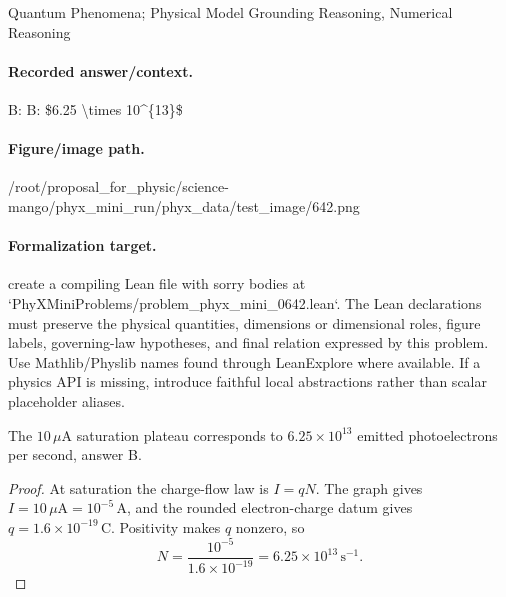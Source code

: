 Quantum Phenomena; Physical Model Grounding Reasoning, Numerical Reasoning

\paragraph{Recorded answer/context.}
B: B: \$6.25 \textbackslash{}times 10\textasciicircum{}\{13\}\$

\paragraph{Figure/image path.}
/root/proposal\_for\_physic/science-mango/phyx\_mini\_run/phyx\_data/test\_image/642.png

\paragraph{Formalization target.}
create a compiling Lean file with sorry bodies at `PhyXMiniProblems/problem\_phyx\_mini\_0642.lean`. The Lean declarations must preserve the physical quantities, dimensions or dimensional roles, figure labels, governing-law hypotheses, and final relation expressed by this problem.
Use Mathlib/Physlib names found through LeanExplore where available. If a physics API is missing, introduce faithful local abstractions rather than scalar placeholder aliases.

\begin{theorem}
\label{thm:physics:phyx_mini_0642:target}
The \(10\,\mu\mathrm A\) saturation plateau corresponds to
\(6.25\times10^{13}\) emitted photoelectrons per second, answer B.
\end{theorem}
\begin{proof}
At saturation the charge-flow law is \(I=qN\).  The graph gives
\(I=10\,\mu\mathrm A=10^{-5}\,\mathrm A\), and the rounded electron-charge
datum gives \(q=1.6\times10^{-19}\,\mathrm C\).  Positivity makes \(q\)
nonzero, so
\[
 N=\frac{10^{-5}}{1.6\times10^{-19}}
  =6.25\times10^{13}\,\mathrm{s^{-1}}.
\]
\end{proof}

